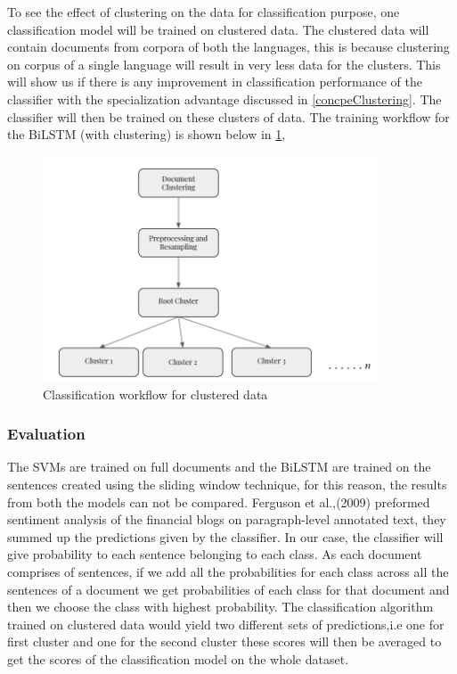 To see the effect of clustering on the data for classification purpose, one classification model will be trained on clustered data. The clustered data will contain documents from corpora of both the languages, this is because clustering on corpus of a single language will result in very less data for the clusters. This will show us if there is any improvement in classification performance of the classifier with the specialization advantage discussed in \ref{concpeClustering}. The classifier will then be trained on these clusters of data. The training workflow for the \gls{BiLSTM} (with clustering) is shown below in \ref{fig:clusterFlowClassification}, 

\begin{figure}[!ht]
    \centering
    \includegraphics[width=10cm,keepaspectratio]{pics/approach_cls.png}
    \caption{Classification workflow for clustered data}
    \label{fig:clusterFlowClassification}
\end{figure}

\subsubsection*{Evaluation} \label{evaluationQuestionOne}
The \glspl{SVM} are trained on full documents and the \gls{BiLSTM} are trained on the sentences created using the  sliding window technique, for this reason, the results from both the models can not be compared. Ferguson et al.,(2009) \cite{ferguson2009exploring} preformed sentiment analysis of the financial blogs on paragraph-level 
annotated text, they summed up the predictions given by the classifier. In our case, the classifier will give probability to each sentence belonging to each class. As each document comprises of sentences, if we add all the probabilities for each class across all the sentences of a document we get probabilities of each class for that document and then we choose the class with highest probability. The classification algorithm trained on clustered data would yield two different sets of predictions,i.e one for first cluster and one for the second cluster these scores will then be averaged to get the scores of the classification model on the whole dataset.

